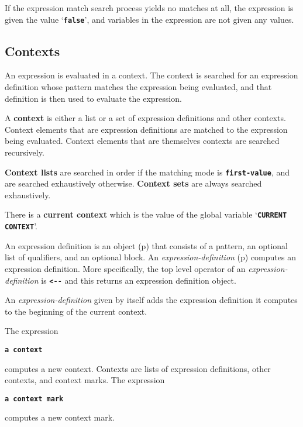\documentclass[12pt]{article}
\newcommand{\TT}[1]{{\tt \bfseries #1}}
\newcommand{\key}[1]{{\rm \bfseries #1}}
\newcommand{\ttkey}[1]{{\tt \bfseries #1}}
\newcommand{\pagref}[1]{p\pageref{#1}}
\newenvironment{indpar}[1][0.3in]%
	{\begin{list}{}%
		     {\setlength{\itemsep}{0in}%
		      \setlength{\topsep}{0in}%
		      \setlength{\parsep}{1ex}%
		      \setlength{\labelwidth}{#1}%
		      \setlength{\leftmargin}{#1}%
		      \addtolength{\leftmargin}{\labelsep}}%
	 \item}%
	{\end{list}}
\begin{document}
If the expression match search process yields no matches at all,
the expression is given the value `\TT{false}', and variables in the
expression are not given any values.

\subsection{Contexts}
\label{CONTEXTS}

An expression is evaluated in a context.  The context is searched
for an expression definition whose pattern matches the expression being
evaluated, and that definition is then used to evaluate the expression.

A \key{context} is either a list or a set of expression definitions and
other contexts.  Context elements that are expression definitions are
matched to the expression being evaluated.  Context elements that are
themselves contexts are searched recursively.

\key{Context lists}
\label{CONTEXT-MODE}
are searched in order if the
matching mode is \TT{first-value}, and are searched exhaustively
otherwise.
\key{Context sets} are always searched exhaustively.

There is a \key{current context} which is the value of the
global variable `\ttkey{CURRENT CONTEXT}'.

An expression definition is an object (\pagref{OBJECT})
that consists of a pattern, an optional list of qualifiers,
and an optional block.  An
{\em expression-definition} (\pagref{EXPRESSION-DEFINITION})
computes an expression definition.  More specifically, the
top level operator of an {\em expression-definition} is \TT{<-{}-}
and this returns an expression definition object.

An {\em expression-definition} given by itself adds the
expression definition it computes to the beginning
of the current context.

The expression
\begin{indpar}
\ttkey{a context}
\end{indpar}
computes a new context.  Contexts are lists of expression
definitions, other contexts, and context marks.  The expression
\begin{indpar}
\ttkey{a context mark}
\end{indpar}
computes a new context mark.
\end{document}
